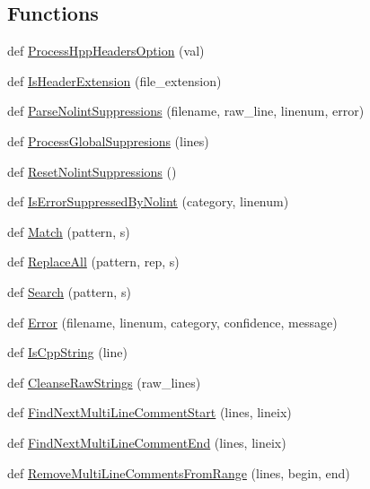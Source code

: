 \subsection*{Functions}
\begin{DoxyCompactItemize}
\item 
def \hyperlink{namespacecpplint_a28e546a8f20e32ef7dcf4ecbecd8b367}{Process\+Hpp\+Headers\+Option} (val)
\item 
def \hyperlink{namespacecpplint_ad4fd5ecbae967884b0a77ee8b3ba1e16}{Is\+Header\+Extension} (file\+\_\+extension)
\item 
def \hyperlink{namespacecpplint_a52ae8f1d9436d14ddb94ceed06026c43}{Parse\+Nolint\+Suppressions} (filename, raw\+\_\+line, linenum, error)
\item 
def \hyperlink{namespacecpplint_a316dc237dc0cde7bafec3c30d5624cac}{Process\+Global\+Suppresions} (lines)
\item 
def \hyperlink{namespacecpplint_a1d92dc3582da477f98ab5b85bd13fea0}{Reset\+Nolint\+Suppressions} ()
\item 
def \hyperlink{namespacecpplint_a0b9e1f991f1a3d02cda3234784241d1f}{Is\+Error\+Suppressed\+By\+Nolint} (category, linenum)
\item 
def \hyperlink{namespacecpplint_a73ac2ecfcd9c52b4a3755176c68dea7e}{Match} (pattern, s)
\item 
def \hyperlink{namespacecpplint_a1b85a5657aeab8b4a0ed85e06aed3576}{Replace\+All} (pattern, rep, s)
\item 
def \hyperlink{namespacecpplint_a75eae6bb88590e904f751502c8ee4bab}{Search} (pattern, s)
\item 
def \hyperlink{namespacecpplint_ae51e76d6d73b36b9e965d2ac9d21d7c2}{Error} (filename, linenum, category, confidence, message)
\item 
def \hyperlink{namespacecpplint_a034b93866a853c2e21577fb371a7fa9d}{Is\+Cpp\+String} (line)
\item 
def \hyperlink{namespacecpplint_a61b3f81ef467e7cb417d13e9051180fc}{Cleanse\+Raw\+Strings} (raw\+\_\+lines)
\item 
def \hyperlink{namespacecpplint_af0404401670283c9d4f948180e427401}{Find\+Next\+Multi\+Line\+Comment\+Start} (lines, lineix)
\item 
def \hyperlink{namespacecpplint_a4965d6f615333f43155d9e430471e228}{Find\+Next\+Multi\+Line\+Comment\+End} (lines, lineix)
\item 
def \hyperlink{namespacecpplint_a3a5f71cdc2e78491b4bedde8a0103679}{Remove\+Multi\+Line\+Comments\+From\+Range} (lines, begin, end)

\end{DoxyCompactItemize}
